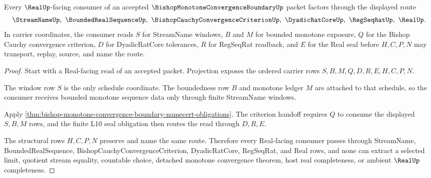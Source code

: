 \begin{theorem}
\label{thm:bishop-monotone-convergence-boundary-l10-nonescape}
Every $\RealUp$-facing consumer of an accepted $\BishopMonotoneConvergenceBoundaryUp$ packet factors through the displayed route
$$
\StreamNameUp,\ \BoundedRealSequenceUp,\ \BishopCauchyConvergenceCriterionUp,\ \DyadicRatCoreUp,\ \RegSeqRatUp,\ \RealUp .
$$
In carrier coordinates, the consumer reads $S$ for StreamName windows, $B$ and $M$ for bounded monotone exposure, $Q$ for the Bishop Cauchy convergence criterion, $D$ for DyadicRatCore tolerances, $R$ for RegSeqRat readback, and $E$ for the Real seal before $H,C,P,N$ may transport, replay, source, and name the route.
\end{theorem}
\begin{proof}
Start with a Real-facing read of an accepted packet. Projection exposes the ordered carrier rows $S,B,M,Q,D,R,E,H,C,P,N$.

The window row $S$ is the only schedule coordinate. The boundedness row $B$ and monotone ledger $M$ are attached to that schedule, so the consumer receives bounded monotone sequence data only through finite StreamName windows.

Apply \autoref{thm:bishop-monotone-convergence-boundary-namecert-obligations}. The criterion handoff requires $Q$ to consume the displayed $S,B,M$ rows, and the finite L10 seal obligation then routes the read through $D,R,E$.

The structural rows $H,C,P,N$ preserve and name the same route. Therefore every Real-facing consumer passes through StreamName, BoundedRealSequence, BishopCauchyConvergenceCriterion, DyadicRatCore, RegSeqRat, and Real rows, and none can extract a selected limit, quotient stream equality, countable choice, detached monotone convergence theorem, host real completeness, or ambient $\RealUp$ completeness.
\end{proof}



